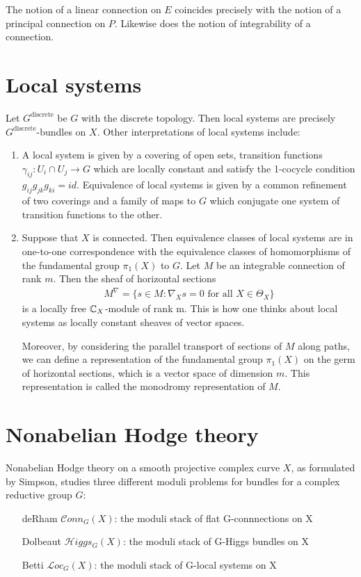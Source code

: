 \documentclass[12pt]{article}
\begin{document}
The notion of a linear connection on $E$ coincides precisely with the notion of a principal connection on $P$. Likewise does the notion of integrability of a connection.

\section{Local systems}
Let $G^{\text{discrete}}$ be $G$ with the discrete topology. Then local systems are precisely $G^{\text{discrete}}$-bundles on $X$. Other interpretations of local systems include:
\begin{enumerate}
    \item A local system is given by a covering of open sets, transition functions
     \( \gamma_{ij} : U_i \cap U_j \to G \) which are locally constant and satisfy the 1-cocycle condition \( g_{ij} g_{jk} g_{ki} = id \). Equivalence of local systems is given by a common refinement of two coverings and a family of maps to \( G \) which conjugate one system of transition functions to the other.

    \item Suppose that \( X \) is connected. Then equivalence classes of local systems are in one-to-one correspondence with the equivalence classes of homomorphisms of the fundamental group \( \pi_1(X) \) to \( G \). Let $M$ be an integrable connection of rank $m$. Then the sheaf of horizontal sections \begin{align*}
        M^{\nabla} = \{s\in M : \nabla_X s = 0 \text{ for all } X\in \Theta_X\}
    \end{align*} is a locally free $\mathbb{C}_X$-module of rank m. This is how one thinks about local systems as locally constant sheaves of vector spaces.
    
    Moreover, by considering the parallel transport of sections of $M$ along paths, we can define a representation of the fundamental group $\pi_1(X)$ on the germ of horizontal sections, which is a vector space of dimension $m$. This representation is called the monodromy representation of $M$. 
\end{enumerate}

\section{Nonabelian Hodge theory}

Nonabelian Hodge theory on a smooth projective complex curve $X$, as formulated by Simpson, studies three different moduli problems for bundles for a complex reductive group $G$:
\begin{enumerate}
    \item [deRham] $\mathcal{C}onn_G(X)$: the moduli stack of flat G-connnections on X
    \item [Dolbeaut] $\mathcal{H}iggs_G(X)$: the moduli stack of G-Higgs bundles on X
    \item [Betti] $\mathcal{L}oc_G(X)$: the moduli stack of G-local systems on X
\end{enumerate}
\end{document}
